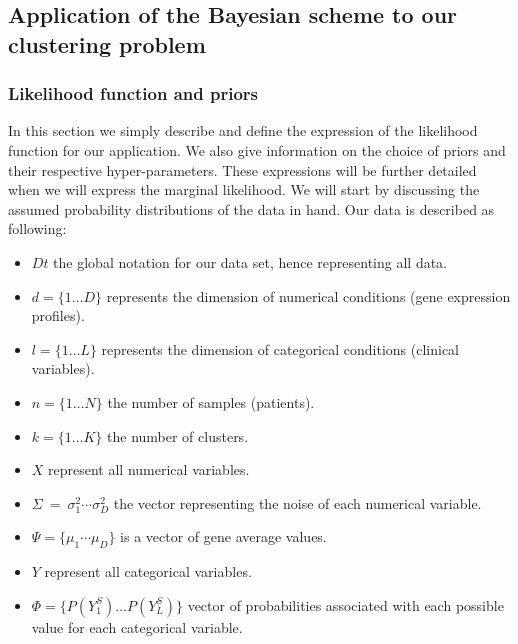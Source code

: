 \documentclass[twocolumn]{article}
\begin{document}
\subsection{Application of the Bayesian scheme to our clustering problem}

\subsubsection{Likelihood function and priors}

In this section we simply describe and define the expression of the likelihood function for our application. We also give information on the choice of priors and their respective hyper-parameters.
These expressions will be further detailed when we will express the marginal likelihood.
We will start by discussing the assumed probability distributions of the data in hand.
Our data is described as following:
\begin{itemize}
    \item $Dt$ the global notation for our data set, hence representing all data.
    \item $d=\{1\dots D\}$ represents the dimension of numerical conditions (gene expression profiles).
    \item $l=\{1\dots L\}$ represents the dimension of categorical conditions (clinical variables).
    \item $n=\{1\dots N\}$ the number of samples (patients).
    \item $k=\{1\dots K\}$ the number of clusters.
    \item $X$ represent all numerical variables.
    \item $\Sigma\ =\ {\sigma_1^2\cdots\sigma_D^2}$ the vector representing the noise of each numerical variable.
    \item $\Psi=\{\mu_1\cdots \mu_D\}$ is a vector of gene average values.
    \item $Y$ represent all categorical variables.
    \item $\Phi=\{P(Y_{1}^S)\dots P(Y_{L}^S)\}$ vector of probabilities associated with each possible value for each categorical variable.
\end{itemize}
\end{document}
